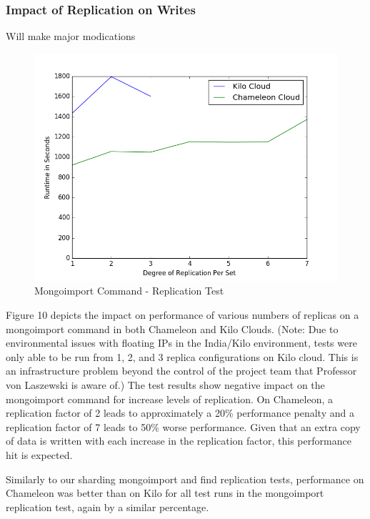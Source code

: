 \documentclass[9pt,twocolumn,twoside]{../../styles/osajnl}
\begin{document}
\subsubsection{Impact of Replication on Writes}

Will make major modications

\begin{figure}[!ht]
  \includegraphics[scale=0.45]{images/replica_import.png}
  \caption{Mongoimport Command - Replication Test}
\end{figure}


Figure 10 depicts the impact on performance of various numbers of replicas on a mongoimport command in both Chameleon and Kilo Clouds.  (Note: Due to environmental issues with floating IPs in the India/Kilo environment, tests were only able to be run from 1, 2, and 3 replica configurations on Kilo cloud.  This is an infrastructure problem beyond the control of the project team that Professor von Laszewski is aware of.)  The test results show negative impact on the mongoimport command for increase levels of replication.  On Chameleon, a replication factor of 2 leads to approximately a 20\% performance penalty and a replication factor of 7 leads to 50\% worse performance.  Given that an extra copy of data is written with each increase in the replication factor, this performance hit is expected.  

Similarly to our sharding mongoimport and find replication tests, performance on Chameleon was better than on Kilo for all test runs in the mongoimport replication test, again by a similar percentage.
\end{document}
